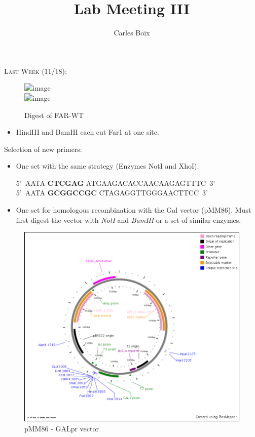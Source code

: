 \documentclass{beamer}
\title[Lab Meeting III]{Lab Meeting III}
\author{Carles Boix}
\begin{document}
\begin{frame}
    \begin{center}
        {\large \textsc{Last Week (11/18):}}
    \end{center}
    \begin{figure}[ht!]
        \centering
        \includegraphics<1>[width=.9\textwidth]{FARwtdigest.png}\\
        \includegraphics<2>[width=.9\textwidth]{FARwtdigestNEB.png}
        \caption{Digest of FAR-WT}
        \label{fig:pcr}
    \end{figure}

    \begin{itemize}
        \item<2> HindIII and BamHI each cut Far1 at one site.
    \end{itemize}

\end{frame}


\begin{frame}{Selection of new primers:}
    \begin{itemize}
        \item One set with the same strategy (Enzymes NotI and XhoI).

            \begin{center}
            \scriptsize
            5'\, AATA \textbf{CTCGAG} ATGAAGACACCAACAAGAGTTTC\, 3' \\
            5'\, AATA \textbf{GCGGCCGC} CTAGAGGTTGGGAACTTCC\, 3' \\
            \end{center}
\normalsize

    \item One set for homologous recombination with the Gal vector (pMM86). Must first digest the vector with \emph{NotI} and \emph{BamHI} or a set of similar enzymes.
    \end{itemize}
\end{frame}

\begin{frame}
    \begin{figure}[ht!]
        \centering
        \includegraphics[width=.8\textwidth]{../Documents/plasMap_pMM86.png}
        \caption{pMM86 - GALpr vector}
        \label{fig:ligc}
    \end{figure}
\end{frame}
\end{document}
